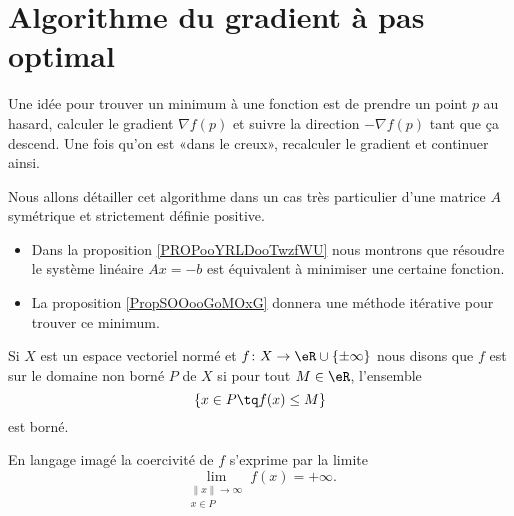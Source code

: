
\section{Algorithme du gradient à pas optimal}

Une idée pour trouver un minimum à une fonction est de prendre un point \( p\) au hasard, calculer le gradient \(\nabla f(p) \) et suivre la direction \(-\nabla f(p)\) tant que ça descend. Une fois qu'on est «dans le creux», recalculer le gradient et continuer ainsi.

Nous allons détailler cet algorithme dans un cas très particulier d'une matrice \( A\) symétrique et strictement définie positive. 
\begin{itemize}
    \item Dans la proposition \ref{PROPooYRLDooTwzfWU} nous montrons que résoudre le système linéaire \( Ax=-b\) est équivalent à minimiser une certaine fonction.
    \item La proposition \ref{PropSOOooGoMOxG} donnera une méthode itérative pour trouver ce minimum.
\end{itemize}

\begin{definition}  \label{DefQXPooYSygGP}
    Si \( X\) est un espace vectoriel normé et \( f\colon X\to \eR\cup\{ \pm\infty \}\) nous disons que \( f\) est  sur le domaine non borné \( P\) de \( X\) si pour tout \( M\in \eR\), l'ensemble
    \begin{equation}
        \{ x\in P\tq f(x)\leq M \}
    \end{equation}
    est borné.
\end{definition}
En langage imagé la coercivité de \( f\) s'exprime par la limite
\begin{equation}
    \lim_{\substack{\| x \|\to \infty\\x\in P}}f(x)=+\infty.
\end{equation}


